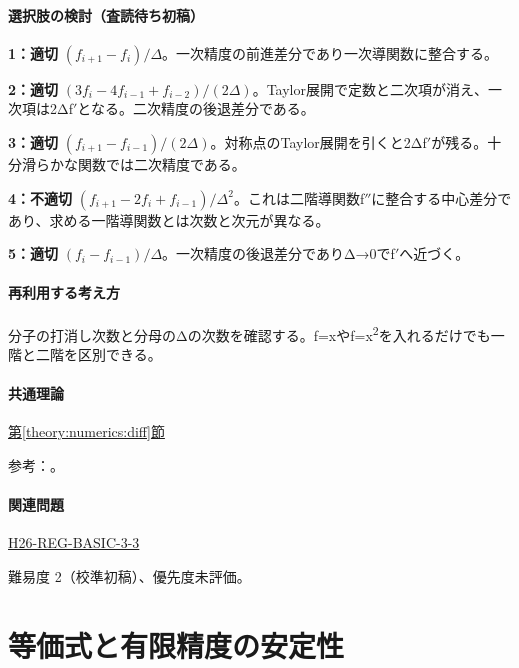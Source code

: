 \paragraph{選択肢の検討（査読待ち初稿）}\mbox{}\par

\noindent\textbf{1：適切} \((f_{i+1}-f_i)/\Delta\)。一次精度の前進差分であり一次導関数に整合する。\par

\noindent\textbf{2：適切} \((3f_i-4f_{i-1}+f_{i-2})/(2\Delta)\)。Taylor展開で定数と二次項が消え、一次項は2Δf\ensuremath{'}となる。二次精度の後退差分である。\par

\noindent\textbf{3：適切} \((f_{i+1}-f_{i-1})/(2\Delta)\)。対称点のTaylor展開を引くと2Δf\ensuremath{'}が残る。十分滑らかな関数では二次精度である。\par

\noindent\textbf{4：不適切} \((f_{i+1}-2f_i+f_{i-1})/\Delta^2\)。これは二階導関数f\ensuremath{''}に整合する中心差分であり、求める一階導関数とは次数と次元が異なる。\par

\noindent\textbf{5：適切} \((f_i-f_{i-1})/\Delta\)。一次精度の後退差分でありΔ→0でf\ensuremath{'}へ近づく。\par

\paragraph{再利用する考え方} 分子の打消し次数と分母のΔの次数を確認する。f=\allowbreak{}xやf=\allowbreak{}x\textsuperscript{2}を入れるだけでも一階と二階を区別できる。

\paragraph{共通理論} \hyperref[theory:numerics:diff]{第\ref*{theory:numerics:diff}節}

\par 参考：\cite{nist_differentiation}。

\paragraph{関連問題} \hyperref[q:h26-reg-basic-3-3]{H26-REG-BASIC-3-3}

\par 難易度 2（校準初稿）、優先度未評価。

\section{等価式と有限精度の安定性}

